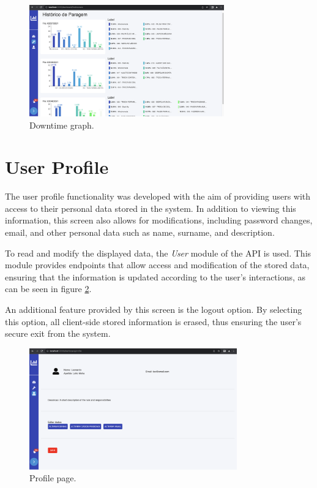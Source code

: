 \begin{figure}[htbp]
	\centering
	\includegraphics[width=0.75\textwidth]{images/downtime.png}
	\caption{Downtime graph.}
	\label{fig:downtime}
\end{figure}

\section[User Profile]{User Profile}\label{sec:profile}

The user profile functionality was developed with the aim of providing users with access to their personal data stored in the system. In addition to viewing this information, this screen also allows for modifications, including password changes, email, and other personal data such as name, surname, and description.

To read and modify the displayed data, the \textit{User} module of the \gls{API} is used. This module provides endpoints that allow access and modification of the stored data, ensuring that the information is updated according to the user's interactions, as can be seen in figure \ref{fig:profilePage}.

An additional feature provided by this screen is the logout option. By selecting this option, all client-side stored information is erased, thus ensuring the user's secure exit from the system.

\begin{figure}[htbp]
	\centering
	\includegraphics[width=0.8\textwidth]{images/profile.png}
	\caption{Profile page.}
	\label{fig:profilePage}
\end{figure}
